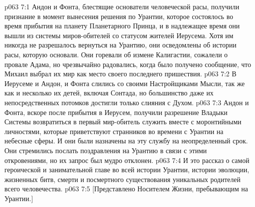 \vs p063 7:1 Андон и Фонта, блестящие основатели человеческой расы, получили признание в момент вынесения решения по Урантии, которое состоялось во время прибытия на планету Планетарного Принца, и в надлежащее время они вышли из системы миров\hyp{}обителей со статусом жителей Иерусема. Хотя им никогда не разрешалось вернуться на Урантию, они осведомлены об истории расы, которую основали. Они горевали об измене Калигастии, сожалели о провале Адама, но чрезвычайно радовались, когда было получено сообщение, что Михаил выбрал их мир как место своего последнего пришествия.
\vs p063 7:2 В Иерусеме и Андон, и Фонта слились со своими Настройщиками Мысли, так же как и несколько их детей, включая Сонтада, но большинство даже их непосредственных потомков достигли только слияния с Духом.
\vs p063 7:3 Андон и Фонта, вскоре после прибытия в Иерусем, получили разрешение Владыки Системы возвратиться в первый мир\hyp{}обитель служить вместе с моронтийными личностями, которые приветствуют странников во времени с Урантии на небесные сферы. И они были назначены на эту службу на неопределенный срок. Они стремились послать поздравления на Урантию в связи с этими откровениями, но их запрос был мудро отклонен.
\vs p063 7:4 \pc И это рассказ о самой героической и занимательной главе во всей истории Урантии, истории эволюции, жизненных битв, смерти и посмертного существования уникальных родителей всего человечества.
\vsetoff
\vs p063 7:5 [Представлено Носителем Жизни, пребывающим на Урантии.]
